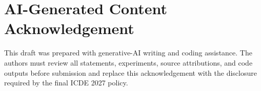 \documentclass[conference]{IEEEtran}
\begin{document}
\section*{AI-Generated Content Acknowledgement}
This draft was prepared with generative-AI writing and coding assistance. The authors must review all statements, experiments, source attributions, and code outputs before submission and replace this acknowledgement with the disclosure required by the final ICDE 2027 policy.



\end{document}
